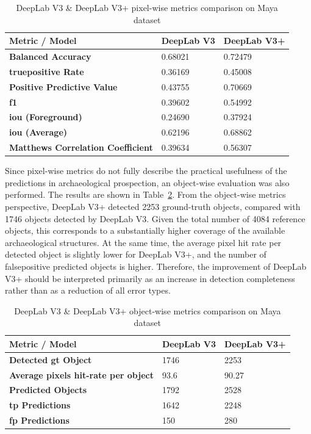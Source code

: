 \begin{table}[H]
    \centering
    \caption{DeepLab V3 \& DeepLab V3+ pixel-wise metrics comparison on Maya dataset}
    \begin{tabular}{|l|ll|}
    \hline
        \textbf{Metric / Model} & \textbf{DeepLab V3} & \textbf{DeepLab V3+} \\ \hline
        \textbf{Balanced Accuracy} & 0.68021 & 0.72479 \\
        \textbf{\gls{truepositive} Rate} & 0.36169 & 0.45008 \\
        \textbf{Positive Predictive Value} & 0.43755 & 0.70669 \\
        \textbf{\gls{f1}} & 0.39602 & 0.54992 \\
        \textbf{\gls{iou} (Foreground)} & 0.24690 & 0.37924 \\
        \textbf{\gls{iou} (Average)} & 0.62196 & 0.68862 \\
        \textbf{Matthews Correlation Coefficient} & 0.39634 & 0.56307 \\ \hline
    \end{tabular}
    \label{tab:maya_v3_v3plus_metrics}
\end{table}

Since pixel-wise metrics do not fully describe the practical usefulness of the predictions in archaeological prospection, an object-wise evaluation was also performed. The results are shown in Table~\ref{tab:maya_v3_v3plus_object_metrics}. From the object-wise metrics perspective, DeepLab V3+ detected 2253 ground-truth objects, compared with 1746 objects detected by DeepLab V3. Given the total number of 4084 reference objects, this corresponds to a substantially higher coverage of the available archaeological structures. At the same time, the average pixel hit rate per detected object is slightly lower for DeepLab V3+, and the number of \gls{falsepositive} predicted objects is higher. Therefore, the improvement of DeepLab V3+ should be interpreted primarily as an increase in detection completeness rather than as a reduction of all error types.

\begin{table}[H]
    \centering
    \caption{DeepLab V3 \& DeepLab V3+ object-wise metrics comparison on Maya dataset}
    \begin{tabular}{|l|ll|}
    \hline
        \textbf{Metric / Model} & \textbf{DeepLab V3} & \textbf{DeepLab V3+} \\ \hline
        \textbf{Detected \gls{gt} Object} & 1746 & 2253 \\
        \textbf{Average pixels hit-rate per object} & 93.6 & 90.27 \\
        \textbf{Predicted Objects} & 1792 & 2528 \\
        \textbf{\gls{tp} Predictions} & 1642 & 2248 \\
        \textbf{\gls{fp} Predictions} & 150 & 280 \\ \hline
    \end{tabular}
    \label{tab:maya_v3_v3plus_object_metrics}
\end{table}

